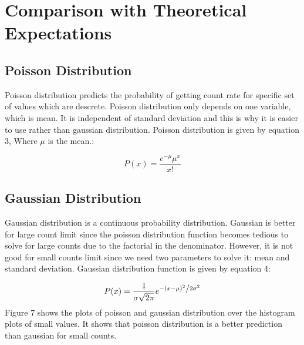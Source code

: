 \documentclass[letterpaper,12pt]{article}
\begin{document}
\section{Comparison with Theoretical Expectations}
\label{sec:comparison with theoretical expectations}
\subsection{Poisson Distribution}
\label{sec:poisson distribution}
Poisson distribution predicts the probability of getting count rate for specific set of values which are descrete. Poisson distribution only depends on one variable, which is mean. It is independent of standard deviation and this is why it is easier to use rather than gaussian distribution. Poisson distribution is given by equation 3, Where \begin{math}\mu \end{math} is the mean.:

\begin{equation} \label{poisson} P\left( x \right) = \frac{{e^{ - \mu } \mu ^x }}{{x!}} \end{equation}

\subsection{Gaussian Distribution}
\label{sec:gaussian distribution}
Gaussian distribution is a continuous probability distribution. Gaussian is better for large count limit since the poisson distribution function becomes tedious to solve for large counts due to the factorial in the denominator. However, it is not good for small counts limit since we need two parameters to solve it: mean and standard deviation.
Gaussian distribution function is given by equation 4:

\begin{equation}
\label{gaussian}
P(x) = \frac{1}{{\sigma \sqrt {2\pi } }}e^{{{ - \left( {x - \mu } \right)^2 } \mathord{\left/ {\vphantom {{ - \left( {x - \mu } \right)^2 } {2\sigma ^2 }}} \right. \kern-\nulldelimiterspace} {2\sigma ^2 }}}
\end{equation}
Figure 7 shows the plots of poisson and gaussian distribution over the histogram plots of small values. It shows that poisson distribution is a better prediction than gaussian for small counts.
\end{document}
